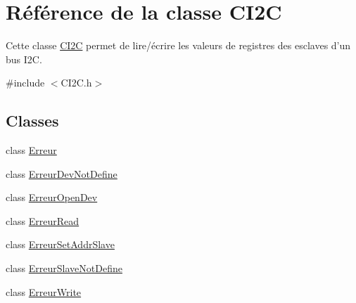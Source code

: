 \hypertarget{class_c_i2_c}{\section{Référence de la classe C\+I2\+C}
\label{class_c_i2_c}
}


Cette classe \hyperlink{class_c_i2_c}{C\+I2\+C} permet de lire/écrire les valeurs de registres des esclaves d'un bus I2\+C.  




{\ttfamily \#include $<$C\+I2\+C.\+h$>$}

\subsection*{Classes}
\begin{DoxyCompactItemize}
\item 
class \hyperlink{class_c_i2_c_1_1_erreur}{Erreur}
\item 
class \hyperlink{class_c_i2_c_1_1_erreur_dev_not_define}{Erreur\+Dev\+Not\+Define}
\item 
class \hyperlink{class_c_i2_c_1_1_erreur_open_dev}{Erreur\+Open\+Dev}
\item 
class \hyperlink{class_c_i2_c_1_1_erreur_read}{Erreur\+Read}
\item 
class \hyperlink{class_c_i2_c_1_1_erreur_set_addr_slave}{Erreur\+Set\+Addr\+Slave}
\item 
class \hyperlink{class_c_i2_c_1_1_erreur_slave_not_define}{Erreur\+Slave\+Not\+Define}
\item 
class \hyperlink{class_c_i2_c_1_1_erreur_write}{Erreur\+Write}
\end{DoxyCompactItemize}
